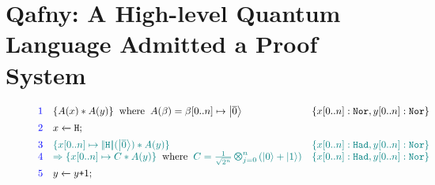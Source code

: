 \section{Qafny: A High-level Quantum Language Admitted a Proof System}
\label{sec:qafny}

\begin{figure}[t]
{\small
\[\hspace*{-0.5em}
\begin{array}{r l l}
\textcolor{blue}{1}
&
\{A(x) * A(y) \}
\;\;\text{where}\;\;
A(\beta) = \beta[0..n] \mapsto \ket{\overline{0}} 
&
\{x[0..n]: \tnort, y[0..n]: \tnort\}
\\[0.5em]
\textcolor{blue}{2}
& \ssassign{x}{}{\ihadh};\\[0.5em]

\textcolor{blue}{3}
&
\textcolor{teal}{
\{x[0..n] \mapsto \dabs{\ihadh}(\ket{\overline{0}}) * A(y) \}
}
&
\textcolor{teal}{
\{x[0..n]: \thadt, y[0..n]: \tnort\}
}
\\
\textcolor{blue}{4}
&
\textcolor{teal}{
\Rightarrow
\{x[0..n] \mapsto C * A(y) \}
}
\;\;\text{where}\;\;
\textcolor{teal}{
C = \shad{2^n}{n}{}
}
&
\textcolor{teal}{
\{x[0..n]: \thadt, y[0..n]: \tnort\}
}
\\[0.5em]
\textcolor{blue}{5}
& \ssassign{y}{}{y\splus 1};
\\[0.5em]


\end{array}\]}
\end{figure}
